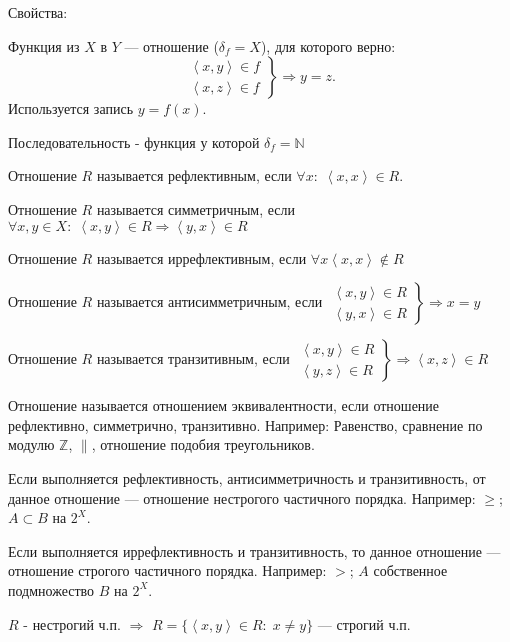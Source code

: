 \documentclass[12pt]{article}
\begin{document}
Свойства:
\begin{enumurate}
    \item Функция из $X$ в  $Y$ --- отношение ($\delta_f = X$), для которого верно:
    \[
    \left. \begin{array}{l} \left<x,y\right> \in f \\ \left<x, z\right> \in f \end{array} \right\} \Rightarrow y = z
    .\]
    Используется запись $y = f(x)$. 
    \item Последовательность - функция у которой $\delta_f = \mathbb{N}$
    \item Отношение $R$ называется рефлективным, если $\forall x: \; \left<x, x\right> \in R$.
    \item Отношение $R$ называется симметричным, если  $\forall x, y \in X: \; \left<x, y\right> \in R \Rightarrow \left<y, x\right> \in R$
    \item Отношение $R$ называется иррефлективным, если  $\forall x \left<x,x\right> \notin R$
    \item Отношение $R$ называется антисимметричным, если  $\left. \begin{array}{r} \left<x, y\right> \in R \\ \left<y, x\right> \in R\end{array} \right\} \Rightarrow x = y$
    \item Отношение $R$ называется транзитивным, если  $\left. \begin{array}{r} \left<x, y\right> \in R \\ \left<y, z\right> \in R\end{array} \right\} \Rightarrow \left<x, z\right> \in R$\\
    \item Отношение называется отношением эквивалентности, если отношение рефлективно, симметрично, транзитивно. Например: Равенство, сравнение по модулю $\mathbb{Z}$,  $\|$, отношение подобия треугольников.
    \item Если выполняется рефлективность, антисимметричность и транзитивность, от данное отношение --- отношение нестрогого частичного порядка. Например: $\ge$; $A \subset B$ на $2^X$.
    \item Если выполняется иррефлективность и транзитивность, то данное отношение --- отношение строгого частичного порядка. Например: $>$;  $A$ собственное подмножество  $B$ на  $2^X$.
    \item $R$ - нестрогий ч.п.  $\Rightarrow$ $R = \{\left<x,y\right> \in R: \; x \neq y\}$ --- строгий ч.п.
\end{enumurate}
\end{document}
